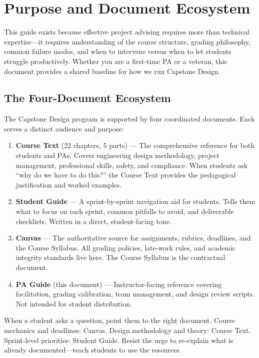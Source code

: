 \section{Purpose and Document Ecosystem}

This guide exists because effective project advising requires more than technical expertise---it requires understanding of the course structure, grading philosophy, common failure modes, and when to intervene versus when to let students struggle productively. Whether you are a first-time PA or a veteran, this document provides a shared baseline for how we run Capstone Design.

\subsection{The Four-Document Ecosystem}

The Capstone Design program is supported by four coordinated documents. Each serves a distinct audience and purpose:

\begin{enumerate}[nosep,leftmargin=1.5em]
\item \textbf{Course Text} (22 chapters, 5 parts) --- The comprehensive reference for both students and PAs. Covers engineering design methodology, project management, professional skills, safety, and compliance. When students ask ``why do we have to do this?'' the Course Text provides the pedagogical justification and worked examples.

\item \textbf{Student Guide} --- A sprint-by-sprint navigation aid for students. Tells them what to focus on each sprint, common pitfalls to avoid, and deliverable checklists. Written in a direct, student-facing tone.

\item \textbf{Canvas} --- The authoritative source for assignments, rubrics, deadlines, and the Course Syllabus. All grading policies, late-work rules, and academic integrity standards live here. The Course Syllabus is the contractual document.

\item \textbf{PA Guide} (this document) --- Instructor-facing reference covering facilitation, grading calibration, team management, and design review scripts. Not intended for student distribution.
\end{enumerate}

\begin{tipbox}
When a student asks a question, point them to the right document. Course mechanics and deadlines: Canvas. Design methodology and theory: Course Text. Sprint-level priorities: Student Guide. Resist the urge to re-explain what is already documented---teach students to use the resources.
\end{tipbox}

